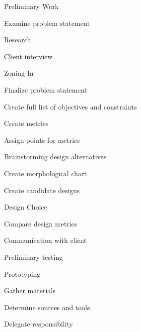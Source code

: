 \documentclass{article}
\begin{document}
        \begin{figure}[htb]
            \begin{framed}
            \centering
            \begin{enumerate*}
                \item Preliminary Work
                \begin{enumerate*}
                    \item Examine problem statement
                    \item Research
                    \item Client interview
                \end{enumerate*}
                \item Zoning In
                \begin{enumerate*}
                    \item Finalize problem statement
                    \item Create full list of objectives and constraints
                    \item Create metrics
                    \item Assign points for metrics
                \end{enumerate*}
                \item Brainstorming design alternatives
                \begin{enumerate*}
                    \item Create morphological chart
                    \item Create candidate designs
                \end{enumerate*}
                \item Design Choice
                \begin{enumerate*}
                    \item Compare design metrics
                    \item Communication with client
                    \item Preliminary testing
                \end{enumerate*}
                \item Prototyping
                \begin{enumerate*}
                    \item Gather materials
                    \item Determine sources and tools
                    \item Delegate responsibility

\end{enumerate*}
\end{enumerate*}
\end{framed}
\end{figure}
\end{document}
